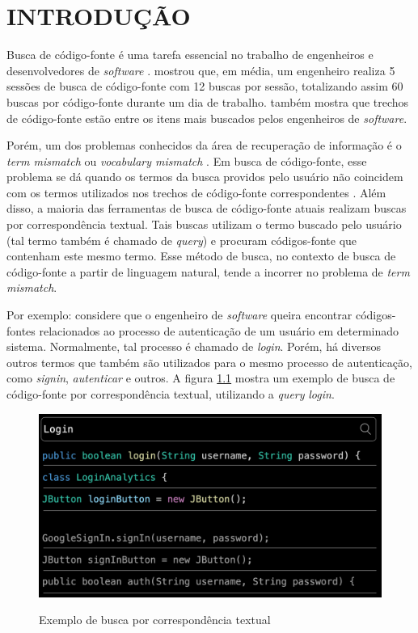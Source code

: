 \chapter{INTRODUÇÃO}
\label{chp:introduction}


Busca de código-fonte é uma tarefa essencial no trabalho de engenheiros e desenvolvedores de \textit{software} \cite{Rahman2018EvaluatingHD}. \textcite{Sadowski2015HowDS} mostrou que, em média, um engenheiro realiza 5 sessões de busca de código-fonte com 12 buscas por sessão, totalizando assim 60 buscas por código-fonte durante um dia de trabalho. \textcite{Xia2017WhatDD} também mostra que trechos de código-fonte estão entre os itens mais buscados pelos engenheiros de \textit{software}.

Porém, um dos problemas conhecidos da área de recuperação de informação é o \textit{term mismatch} ou \textit{vocabulary mismatch} \cite{Furnas1987TheVP} \cite{Carpineto2012ASO}. Em busca de código-fonte, esse problema se dá quando os termos da busca providos pelo usuário não coincidem com os termos utilizados nos trechos de código-fonte correspondentes \cite{Nie2016QueryEB}. Além disso, a maioria das ferramentas de busca de código-fonte atuais realizam buscas por correspondência textual. Tais buscas utilizam o termo buscado pelo usuário (tal termo também é chamado de \textit{query}) e procuram códigos-fonte que contenham este mesmo termo. Esse método de busca, no contexto de busca de código-fonte a partir de linguagem natural, tende a incorrer no problema de \textit{term mismatch}.

Por exemplo: considere que o engenheiro de \textit{software} queira encontrar códigos-fontes relacionados ao processo de autenticação de um usuário em determinado sistema. Normalmente, tal processo é chamado de \textit{login}. Porém, há diversos outros termos que também são utilizados para o mesmo processo de autenticação, como \textit{signin}, \textit{autenticar} e outros. A figura \ref{fig:intro:login-search} mostra um exemplo de busca de código-fonte por correspondência textual, utilizando a \textit{query} \textit{login}.

\begin{figure}[H]
  \centering
  \caption{Exemplo de busca por correspondência textual}
  \includegraphics[width=\textwidth,keepaspectratio=true]{resources/images/introducao/login-search.png}
  \label{fig:intro:login-search}
\end{figure}

